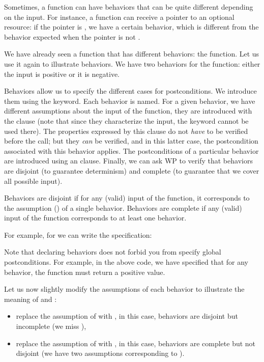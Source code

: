 Sometimes, a function can have behaviors that can be quite different
depending on the input. For instance, a function can receive a pointer to
an optional resource: if the pointer is , we have a
certain behavior, which is different from the behavior expected when
the pointer is not .

We have already seen a function that has different behaviors: the
 function. Let us use it again to illustrate behaviors. We
have two behaviors for the  function: either the input is
positive or it is negative.

Behaviors allow us to specify the different cases for postconditions. We
introduce them using the  keyword. Each behavior
is named. For a given behavior, we have different assumptions about the
input of the function, they are introduced with the clause
 (note that since they characterize the input, the
keyword  cannot be used there).
The properties expressed by this clause do not \emph{have} to be verified before
the call; but they \emph{can} be verified, and in this latter case, the postcondition
associated with this behavior applies. The postconditions of a particular
behavior are introduced using an  clause. Finally, we can ask WP
to verify that behaviors are disjoint (to guarantee determinism) and
complete (to guarantee that we cover all possible input).

Behaviors are disjoint if for any (valid) input of the function, it
corresponds to the assumption () of a single behavior.
Behaviors are complete if any (valid) input of the function corresponds
to at least one behavior.

For example, for  we can write the specification:






Note that declaring behaviors does not forbid you from specify global postconditions.
For example, in the above code, we have specified that for any behavior, the function must
return a positive value.



Let us now slightly modify the assumptions of each behavior to illustrate
the meaning of  and :
\begin{itemize}
\item
  replace the assumption of  with
  , in this case, behaviors are
  disjoint but incomplete (we miss ),
\item
  replace the assumption of  with
  , in this case, behaviors are
  complete but not disjoint (we have two assumptions corresponding
  to ).
\end{itemize}


